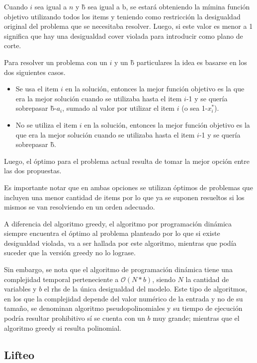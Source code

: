 Cuando $i$ sea igual a $n$ y \~b sea igual a b, se estar\'a obteniendo la m\'imina funci\'on objetivo utilizando todos los items y teniendo como restricci\'on la desigualdad original del problema que se necesitaba resolver. Luego, si este valor es menor a 1 significa que hay una desigualdad cover violada para introducir como plano de corte.



Para resolver un problema con un $i$ y un \~b particulares la idea es basarse en los dos siguientes casos.

\begin{itemize}
\item Se usa el item $i$ en la soluci\'on, entonces la mejor funci\'on objetivo es la que era la mejor soluci\'on cuando se utilizaba hasta el item $i$-1 y se quer\'ia sobrepasar \~b-$a_{i}$, sumado al valor por utilizar el item $i$ (o sea 1-$x_i^*$).
\item No se utiliza el item $i$ en la soluci\'on, entonces la mejor funci\'on objetivo es la que era la mejor soluci\'on cuando se utilizaba hasta el item $i$-1 y se quer\'ia sobrepasar \~b.
\end{itemize}

Luego, el \'optimo para el problema actual resulta de tomar la mejor opci\'on entre las dos propuestas.

Es importante notar que en ambas opciones se utilizan \'optimos de problemas que incluyen una menor cantidad de items por lo que ya se suponen resueltos si los mismos se van resolviendo en un orden adecuado.

A diferencia del algoritmo greedy, el algoritmo por programaci\'on din\'amica siempre encuentra el \'optimo al problema planteado por lo que si existe desigualdad violada, va a ser hallada por este algoritmo, mientras que pod\'ia suceder que la versi\'on greedy no lo lograse. 

Sin embargo, se nota que el algoritmo de programaci\'on din\'amica tiene una complejidad temporal perteneciente a $\mathcal{O}(N*b)$, siendo $N$ la cantidad de variables y $b$ el rhs de la \'unica desigualdad del modelo. Este tipo de algoritmos, en los que la complejidad depende del valor num\'erico de la entrada y no de su tama\~no, se denominan algoritmo pseudopolinomiales y su tiempo de ejecuci\'on podr\'ia resultar prohibitivo s\'i se cuenta con un $b$ muy grande; mientras que el algoritmo greedy si resulta polinomial.


\bigskip
\subsection{Lifteo}

